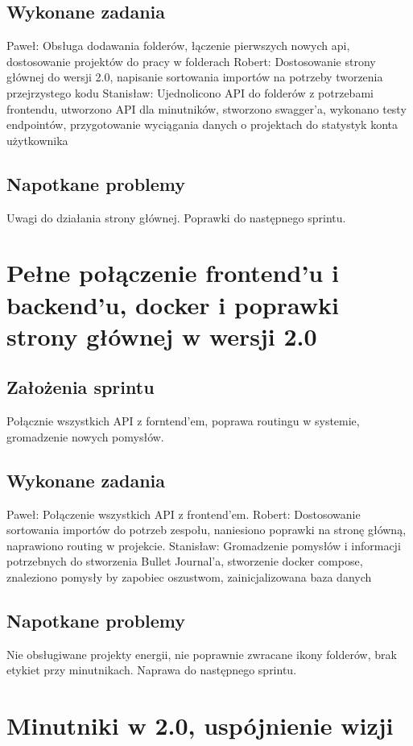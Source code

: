 \documentclass[a4paper,11pt]{report}
\begin{document}
\subsection {Wykonane zadania}
Paweł: Obsługa dodawania folderów, łączenie pierwszych nowych api, dostosowanie projektów do pracy w folderach 
Robert: Dostosowanie strony głównej do wersji 2.0, napisanie sortowania importów na potrzeby tworzenia przejrzystego kodu
Stanisław: Ujednolicono API do folderów z potrzebami frontendu, utworzono API dla minutników, stworzono swagger'a, wykonano testy endpointów, przygotowanie wyciągania danych o projektach do statystyk konta użytkownika  
\subsection {Napotkane problemy}
Uwagi do działania strony głównej. Poprawki do następnego sprintu.

\section {Pełne połączenie frontend'u i backend'u, docker i poprawki strony głównej w wersji 2.0}
\subsection {Założenia sprintu}
Połącznie wszystkich API z forntend'em, poprawa routingu w systemie, gromadzenie nowych pomysłów.
\subsection {Wykonane zadania}
Paweł: Połączenie wszystkich API z frontend'em.
Robert:  Dostosowanie sortowania importów do potrzeb zespołu, naniesiono poprawki na stronę główną, naprawiono routing w projekcie. 
Stanisław: Gromadzenie pomysłów i informacji potrzebnych do stworzenia Bullet Journal'a, stworzenie docker compose, znaleziono pomysły by zapobiec oszustwom, zainicjalizowana baza danych 
\subsection {Napotkane problemy}
Nie obsługiwane projekty energii, nie poprawnie zwracane ikony folderów, brak etykiet przy minutnikach. Naprawa do następnego sprintu.

\section {Minutniki w 2.0, uspójnienie wizji}
\end{document}
